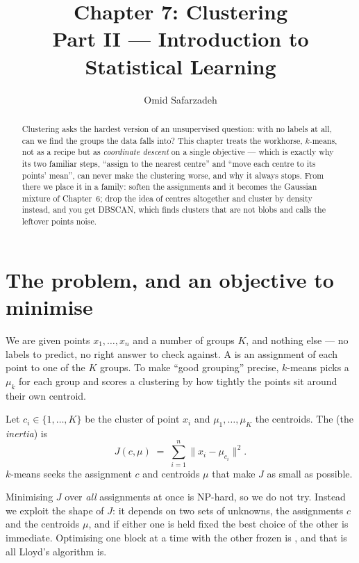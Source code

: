 \documentclass[11pt]{article}
\title{Chapter 7: Clustering \\ \large Part II --- Introduction to Statistical Learning}
\author{Omid Safarzadeh}
\date{}
\begin{document}
\maketitle

\begin{abstract}
\noindent
Clustering asks the hardest version of an unsupervised question: with no
labels at all, can we find the groups the data falls into? This chapter
treats the workhorse, $k$-means, not as a recipe but as \emph{coordinate
descent} on a single objective --- which is exactly why its two familiar
steps, ``assign to the nearest centre'' and ``move each centre to its
points' mean'', can never make the clustering worse, and why it always stops.
From there we place it in a family: soften the assignments and it becomes the
Gaussian mixture of Chapter~6; drop the idea of centres altogether and cluster
by density instead, and you get DBSCAN, which finds clusters that are not
blobs and calls the leftover points noise.
\end{abstract}

\tableofcontents

\section{The problem, and an objective to minimise}

We are given points $x_1,\dots,x_n$ and a number of groups $K$, and nothing
else --- no labels to predict, no right answer to check against. A
 is an assignment of each point to one of the $K$ groups.
To make ``good grouping'' precise, $k$-means picks a 
$\mu_k$ for each group and scores a clustering by how tightly the points sit
around their own centroid.

\begin{definition}
Let $c_i\in\{1,\dots,K\}$ be the cluster of point $x_i$ and $\mu_1,\dots,\mu_K$
the centroids. The  (the
\emph{inertia}) is
\[
  J(c,\mu) \;=\; \sum_{i=1}^{n} \bigl\| x_i - \mu_{c_i} \bigr\|^2 .
\]
$k$-means seeks the assignment $c$ and centroids $\mu$ that make $J$ as small
as possible.
\end{definition}

Minimising $J$ over \emph{all} assignments at once is NP-hard, so we do not try.
Instead we exploit the shape of $J$: it depends on two sets of unknowns, the
assignments $c$ and the centroids $\mu$, and if either one is held fixed the
best choice of the other is immediate. Optimising one block at a time with the
other frozen is , and that is all Lloyd's
algorithm is.
\end{document}
